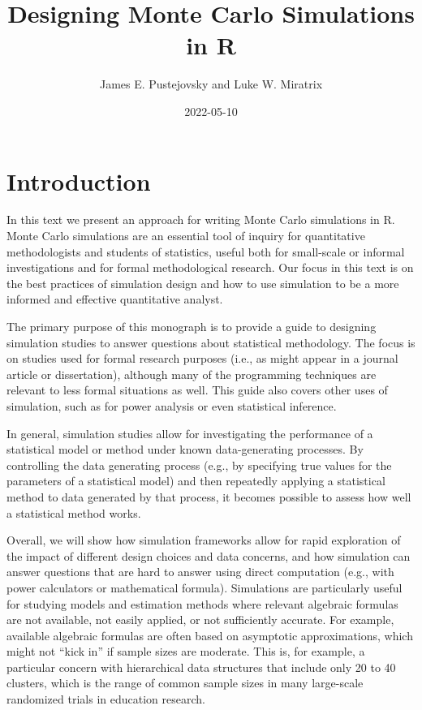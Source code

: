 \documentclass[
]{book}
\title{Designing Monte Carlo Simulations in R}
\author{James E. Pustejovsky and Luke W. Miratrix}
\date{2022-05-10}
\begin{document}
\maketitle

{
\setcounter{tocdepth}{1}
\tableofcontents
}
\hypertarget{introduction}{%
\chapter{Introduction}\label{introduction}}

In this text we present an approach for writing Monte Carlo simulations in R.
Monte Carlo simulations are an essential tool of inquiry for quantitative methodologists and students of statistics, useful both for small-scale or informal investigations and for formal methodological research.
Our focus in this text is on the best practices of simulation design and how to use simulation to be a more informed and effective quantitative analyst.

The primary purpose of this monograph is to provide a guide to designing simulation studies to answer questions about statistical methodology.
The focus is on studies used for formal research purposes (i.e., as might appear in a journal article or dissertation), although many of the programming techniques are relevant to less formal situations as well.
This guide also covers other uses of simulation, such as for power analysis or even statistical inference.

In general, simulation studies allow for investigating the performance of a statistical model or method under known data-generating processes.
By controlling the data generating process (e.g., by specifying true values for the parameters of a statistical model) and then repeatedly applying a statistical method to data generated by that process, it becomes possible to assess how well a statistical method works.

Overall, we will show how simulation frameworks allow for rapid exploration of the impact of different design choices and data concerns, and how simulation can answer questions that are hard to answer using direct computation (e.g., with power calculators or mathematical formula).
Simulations are particularly useful for studying models and estimation methods where relevant algebraic formulas are not available, not easily applied, or not sufficiently accurate.
For example, available algebraic formulas are often based on asymptotic approximations, which might not ``kick in'' if sample sizes are moderate.
This is, for example, a particular concern with hierarchical data structures that include only 20 to 40 clusters, which is the range of common sample sizes in many large-scale randomized trials in education research.
\end{document}
